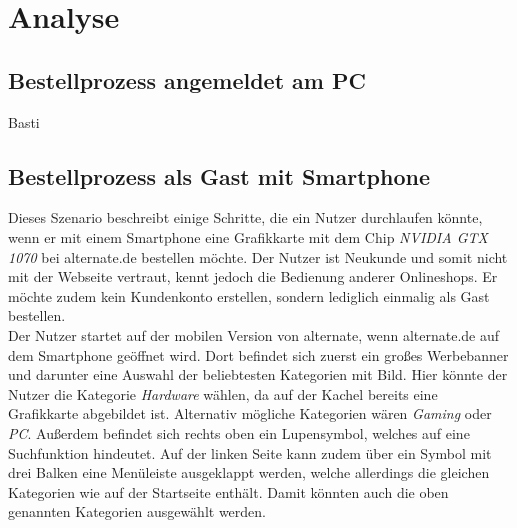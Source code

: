 \documentclass[	12pt, 
				a4paper, 
				BCOR=10mm, %
				DIV=12, 
				parskip=half, %
				headings=small, %
				twoside, %
				ngerman,
				bibliography=totoc,index=totoc, listof=totoc,
				numbers=noendperiod
				]{scrbook} %
\theoremstyle{plain}%
\theoremstyle{definition}
\theoremstyle{remark}
\begin{document}
\section{Analyse}
\subsection{Bestellprozess angemeldet am PC}
Basti

\subsection{Bestellprozess als Gast mit Smartphone}
Dieses Szenario beschreibt einige Schritte, die ein Nutzer durchlaufen könnte, wenn er mit einem Smartphone eine Grafikkarte mit dem Chip \textit{NVIDIA GTX 1070} bei alternate.de bestellen möchte. Der Nutzer ist Neukunde und somit nicht mit der Webseite vertraut, kennt jedoch die Bedienung anderer Onlineshops. Er möchte zudem kein Kundenkonto erstellen, sondern lediglich einmalig als Gast bestellen.\\
Der Nutzer startet auf der mobilen Version von alternate, wenn alternate.de auf dem Smartphone geöffnet wird. Dort befindet sich zuerst ein großes Werbebanner und darunter eine Auswahl der beliebtesten Kategorien mit Bild. Hier könnte der Nutzer die Kategorie \textit{Hardware} wählen, da auf der Kachel bereits eine Grafikkarte abgebildet ist. Alternativ mögliche Kategorien wären \textit{Gaming} oder \textit{PC}. Außerdem befindet sich rechts oben ein Lupensymbol, welches auf eine Suchfunktion hindeutet. Auf der linken Seite kann zudem über ein Symbol mit drei Balken eine Menüleiste ausgeklappt werden, welche allerdings die gleichen Kategorien wie auf der Startseite enthält. Damit könnten auch die oben genannten Kategorien ausgewählt werden.
\end{document}
